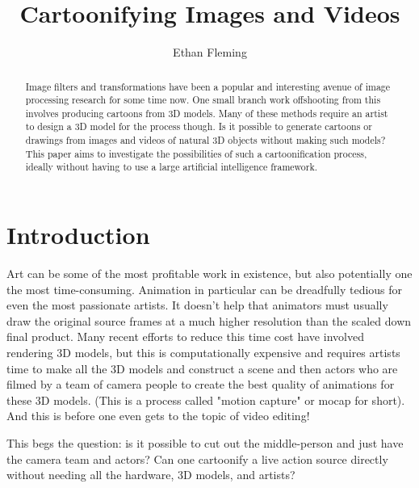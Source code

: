 \documentclass[11pt]{article}
\begin{document}

\title{Cartoonifying Images and Videos}

\author{Ethan Fleming}

\maketitle

\begin{abstract}
  
  Image filters and transformations have been a popular and interesting avenue of image processing research for some time now.
  One small branch work offshooting from this involves producing cartoons from 3D models.
  Many of these methods require an artist to design a 3D model for the process though.
  Is it possible to generate cartoons or drawings from images and videos of natural 3D objects without making such models?
  This paper aims to investigate the possibilities of such a cartoonification process,
  ideally without having to use a large artificial intelligence framework.
  
\end{abstract}

\section{Introduction}

Art can be some of the most profitable work in existence, but also potentially one the most time-consuming.
Animation in particular can be dreadfully tedious for even the most passionate artists.
It doesn't help that animators must usually draw the original source frames at a much higher resolution than the scaled down final product.
Many recent efforts to reduce this time cost have involved rendering 3D models,
but this is computationally expensive and requires artists time to make all the 3D models and construct a scene and
then actors who are filmed by a team of camera people to create the best quality of animations for these 3D models.
(This is a process called "motion capture" or mocap for short).
And this is before one even gets to the topic of video editing!

This begs the question: is it possible to cut out the middle-person and just have the camera team and actors?
Can one cartoonify a live action source directly without needing all the hardware, 3D models, and artists?
\end{document}
